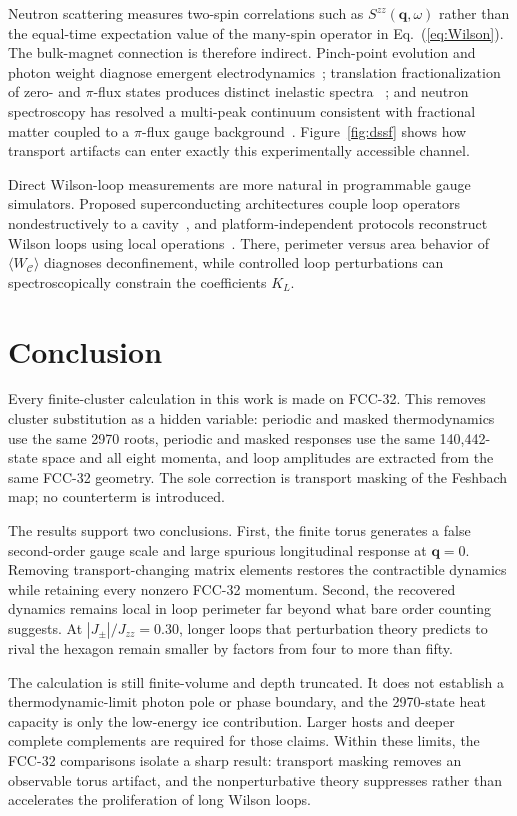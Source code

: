 \documentclass[aps,prb,twocolumn,amsmath,amssymb,superscriptaddress,
longbibliography,floatfix]{revtex4-2}
\newcommand{\Jzz}{J_{zz}}
\newcommand{\Jpm}{J_{\pm}}
\newcommand{\bq}{\bm q}
\begin{document}
Neutron scattering measures two-spin correlations such as
$S^{zz}(\bq,\omega)$ rather than the equal-time expectation value of the
many-spin operator in Eq.~(\ref{eq:Wilson}).  The bulk-magnet connection is
therefore indirect.  Pinch-point evolution and photon weight diagnose
emergent electrodynamics~\cite{Benton2012}; translation fractionalization of
zero- and $\pi$-flux states produces distinct inelastic spectra
~\cite{Desrochers2023}; and neutron spectroscopy has resolved a multi-peak
continuum consistent with fractional matter coupled to a $\pi$-flux gauge
background~\cite{Poree2025}.  Figure~\ref{fig:dssf} shows how transport
artifacts can enter exactly this experimentally accessible channel.

Direct Wilson-loop measurements are more natural in programmable gauge
simulators.  Proposed superconducting architectures couple loop operators
nondestructively to a cavity~\cite{Brennen2016}, and platform-independent
protocols reconstruct Wilson loops using local operations~\cite{Zohar2020}.
There, perimeter versus area behavior of $\langle W_{\mathcal C}\rangle$ diagnoses
deconfinement, while controlled loop perturbations can spectroscopically
constrain the coefficients $K_L$.

\section{Conclusion}
\label{sec:conclusion}

Every finite-cluster calculation in this work is made on FCC-32.  This removes
cluster substitution as a hidden variable: periodic and masked
thermodynamics use the same 2970 roots, periodic and masked responses use the
same 140,442-state space and all eight momenta, and loop amplitudes are
extracted from the same FCC-32 geometry.  The sole correction is transport
masking of the Feshbach map; no counterterm is introduced.

The results support two conclusions.  First, the finite torus generates a
false second-order gauge scale and large spurious longitudinal response at
$\bq=0$.  Removing transport-changing matrix elements restores the
contractible dynamics while retaining every nonzero FCC-32 momentum.  Second,
the recovered dynamics remains local in loop perimeter far beyond what bare
order counting suggests.  At $|\Jpm|/\Jzz=0.30$, longer loops that perturbation
theory predicts to rival the hexagon remain smaller by factors from four to
more than fifty.

The calculation is still finite-volume and depth truncated.  It does not
establish a thermodynamic-limit photon pole or phase boundary, and the
2970-state heat capacity is only the low-energy ice contribution.  Larger
hosts and deeper complete complements are required for those claims.  Within
these limits, the FCC-32 comparisons isolate a sharp result: transport
masking removes an observable torus artifact, and the nonperturbative theory
suppresses rather than accelerates the proliferation of long Wilson loops.



\end{document}
